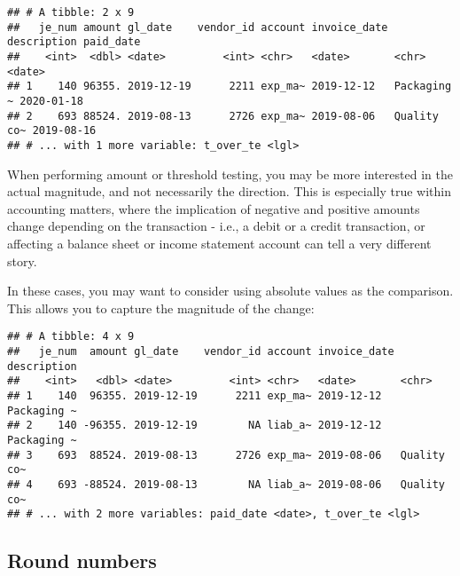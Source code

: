 \documentclass[
]{book}
\newenvironment{Shaded}{\begin{snugshade}}{\end{snugshade}}
\newcommand{\DataTypeTok}[1]{\textcolor[rgb]{0.13,0.29,0.53}{#1}}
\newcommand{\DecValTok}[1]{\textcolor[rgb]{0.00,0.00,0.81}{#1}}
\newcommand{\KeywordTok}[1]{\textcolor[rgb]{0.13,0.29,0.53}{\textbf{#1}}}
\newcommand{\NormalTok}[1]{#1}
\newcommand{\OperatorTok}[1]{\textcolor[rgb]{0.81,0.36,0.00}{\textbf{#1}}}
\newcommand{\StringTok}[1]{\textcolor[rgb]{0.31,0.60,0.02}{#1}}
\begin{document}
\begin{verbatim}
## # A tibble: 2 x 9
##   je_num amount gl_date    vendor_id account invoice_date description paid_date 
##    <int>  <dbl> <date>         <int> <chr>   <date>       <chr>       <date>    
## 1    140 96355. 2019-12-19      2211 exp_ma~ 2019-12-12   Packaging ~ 2020-01-18
## 2    693 88524. 2019-08-13      2726 exp_ma~ 2019-08-06   Quality co~ 2019-08-16
## # ... with 1 more variable: t_over_te <lgl>
\end{verbatim}

When performing amount or threshold testing, you may be more interested in the actual magnitude, and not necessarily the direction. This is especially true within accounting matters, where the implication of negative and positive amounts change depending on the transaction - i.e., a debit or a credit transaction, or affecting a balance sheet or income statement account can tell a very different story.

In these cases, you may want to consider using absolute values as the comparison. This allows you to capture the magnitude of the change:

\begin{Shaded}
\end{Shaded}

\begin{verbatim}
## # A tibble: 4 x 9
##   je_num  amount gl_date    vendor_id account invoice_date description
##    <int>   <dbl> <date>         <int> <chr>   <date>       <chr>      
## 1    140  96355. 2019-12-19      2211 exp_ma~ 2019-12-12   Packaging ~
## 2    140 -96355. 2019-12-19        NA liab_a~ 2019-12-12   Packaging ~
## 3    693  88524. 2019-08-13      2726 exp_ma~ 2019-08-06   Quality co~
## 4    693 -88524. 2019-08-13        NA liab_a~ 2019-08-06   Quality co~
## # ... with 2 more variables: paid_date <date>, t_over_te <lgl>
\end{verbatim}

\hypertarget{round-numbers}{%
\subsection{Round numbers}\label{round-numbers}}
\end{document}

